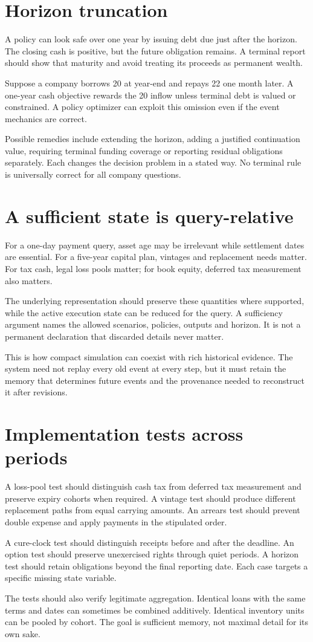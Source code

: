 \section{Horizon truncation}
A policy can look safe over one year by issuing debt due just after the horizon. The closing cash is positive, but the future obligation remains. A terminal report should show that maturity and avoid treating its proceeds as permanent wealth.

Suppose a company borrows 20 at year-end and repays 22 one month later. A one-year cash objective rewards the 20 inflow unless terminal debt is valued or constrained. A policy optimizer can exploit this omission even if the event mechanics are correct.

Possible remedies include extending the horizon, adding a justified continuation value, requiring terminal funding coverage or reporting residual obligations separately. Each changes the decision problem in a stated way. No terminal rule is universally correct for all company questions.

\section{A sufficient state is query-relative}
For a one-day payment query, asset age may be irrelevant while settlement dates are essential. For a five-year capital plan, vintages and replacement needs matter. For tax cash, legal loss pools matter; for book equity, deferred tax measurement also matters.

The underlying representation should preserve these quantities where supported, while the active execution state can be reduced for the query. A sufficiency argument names the allowed scenarios, policies, outputs and horizon. It is not a permanent declaration that discarded details never matter.

This is how compact simulation can coexist with rich historical evidence. The system need not replay every old event at every step, but it must retain the memory that determines future events and the provenance needed to reconstruct it after revisions.

\section{Implementation tests across periods}
A loss-pool test should distinguish cash tax from deferred tax measurement and preserve expiry cohorts when required. A vintage test should produce different replacement paths from equal carrying amounts. An arrears test should prevent double expense and apply payments in the stipulated order.

A cure-clock test should distinguish receipts before and after the deadline. An option test should preserve unexercised rights through quiet periods. A horizon test should retain obligations beyond the final reporting date. Each case targets a specific missing state variable.

The tests should also verify legitimate aggregation. Identical loans with the same terms and dates can sometimes be combined additively. Identical inventory units can be pooled by cohort. The goal is sufficient memory, not maximal detail for its own sake.
